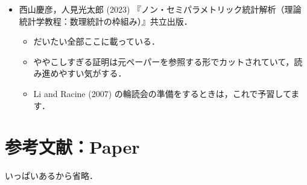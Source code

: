 \documentclass[a4paper,10pt]{jarticle}
\begin{document}
\begin{itemize}
  \item 西山慶彦，人見光太郎 (2023) 『ノン・セミパラメトリック統計解析（理論統計学教程：数理統計の枠組み）』共立出版．
        \begin{itemize}
          \item だいたい全部ここに載っている．
          \item ややこしすぎる証明は元ペーパーを参照する形でカットされていて，読み進めやすい気がする．
          \item Li and Racine (2007) の輪読会の準備をするときは，これで予習してます．
        \end{itemize}
\end{itemize}

\section{参考文献：Paper}
いっぱいあるから省略．
\end{document}
